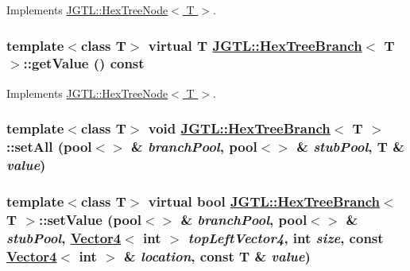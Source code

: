 Implements \hyperlink{class_j_g_t_l_1_1_hex_tree_node_64532266729bda54b7473acde6714604}{JGTL::Hex\-Tree\-Node$<$ T $>$}.\hypertarget{class_j_g_t_l_1_1_hex_tree_branch_25a53141349844dc869458f30db6f2a7}{
\subsubsection[getValue]{\setlength{\rightskip}{0pt plus 5cm}template$<$class T$>$ virtual T \hyperlink{class_j_g_t_l_1_1_hex_tree_branch}{JGTL::Hex\-Tree\-Branch}$<$ T $>$::get\-Value () const}}
\label{class_j_g_t_l_1_1_hex_tree_branch_25a53141349844dc869458f30db6f2a7}




Implements \hyperlink{class_j_g_t_l_1_1_hex_tree_node_81dc320d9ae3cce6b5043696fa70a36d}{JGTL::Hex\-Tree\-Node$<$ T $>$}.\hypertarget{class_j_g_t_l_1_1_hex_tree_branch_2c1642e6125754f5ed1100d2422a7260}{
\subsubsection[setAll]{\setlength{\rightskip}{0pt plus 5cm}template$<$class T$>$ void \hyperlink{class_j_g_t_l_1_1_hex_tree_branch}{JGTL::Hex\-Tree\-Branch}$<$ T $>$::set\-All (pool$<$$>$ \& {\em branch\-Pool}, pool$<$$>$ \& {\em stub\-Pool}, T \& {\em value})}}
\label{class_j_g_t_l_1_1_hex_tree_branch_2c1642e6125754f5ed1100d2422a7260}


\hypertarget{class_j_g_t_l_1_1_hex_tree_branch_26769f998116310e9c17a03ee53f256c}{
\subsubsection[setValue]{\setlength{\rightskip}{0pt plus 5cm}template$<$class T$>$ virtual bool \hyperlink{class_j_g_t_l_1_1_hex_tree_branch}{JGTL::Hex\-Tree\-Branch}$<$ T $>$::set\-Value (pool$<$$>$ \& {\em branch\-Pool}, pool$<$$>$ \& {\em stub\-Pool}, \hyperlink{class_j_g_t_l_1_1_vector4}{Vector4}$<$ int $>$ {\em top\-Left\-Vector4}, int {\em size}, const \hyperlink{class_j_g_t_l_1_1_vector4}{Vector4}$<$ int $>$ \& {\em location}, const T \& {\em value})}}
\label{class_j_g_t_l_1_1_hex_tree_branch_26769f998116310e9c17a03ee53f256c}




